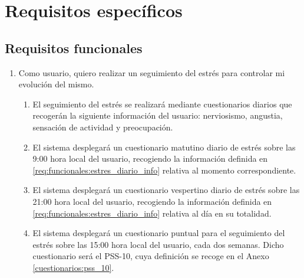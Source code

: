 \section{Requisitos específicos}
    \label{req:especificos}

    \subsection{Requisitos funcionales}
        \label{req:especificos:funcionales}



        \begin{enumerate}[series=req-usuario,label=\textbf{\texttt{RU-\arabic*}}]
            \item \label{req:usuario:seguimiento_estres} Como usuario, quiero realizar un seguimiento del estrés para controlar mi evolución del mismo.
            \begin{enumerate}[series=req-funcionales,label=\textbf{\texttt{RF-\arabic*}}]
                \item \label{req:funcionales:estres_diario_info} El seguimiento del estrés se realizará mediante cuestionarios diarios que recogerán la siguiente información del usuario: nerviosismo, angustia, sensación de actividad y preocupación.
                \item \label{req:funcionales:estres_diario_manana} El sistema desplegará un cuestionario matutino diario de estrés sobre las 9:00 hora local del usuario, recogiendo la información definida en \ref{req:funcionales:estres_diario_info} relativa al momento correspondiente.
                \item \label{req:funcionales:estres_diario_noche}  El sistema desplegará un cuestionario vespertino diario de estrés sobre las 21:00 hora local del usuario, recogiendo la información definida en \ref{req:funcionales:estres_diario_info} relativa al día en su totalidad.      
                \item \label{req:funcionales:estres_puntual} El sistema desplegará un cuestionario puntual para el seguimiento del estrés sobre las 15:00 hora local del usuario, cada dos semanas. Dicho cuestionario será el PSS-10, cuya definición se recoge en el Anexo \ref{cuestionarios:pss_10}.

\end{enumerate}
\end{enumerate}
